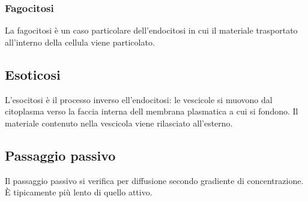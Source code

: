 		\subsubsection{Fagocitosi}
		La fagocitosi \`e un caso particolare dell'endocitosi in cui il materiale trasportato all'interno della cellula viene particolato.

	\subsection{Esoticosi}
	L'esocitosi \`e il processo inverso ell'endocitosi: le vescicole si muovono dal citoplasma verso la faccia interna dell membrana plasmatica a cui si fondono.
	Il materiale contenuto nella vescicola viene rilasciato all'esterno.

	\subsection{Passaggio passivo}
	Il passaggio passivo si verifica per diffusione secondo gradiente di concentrazione.
	\`E tipicamente pi\`u lento di quello attivo.

